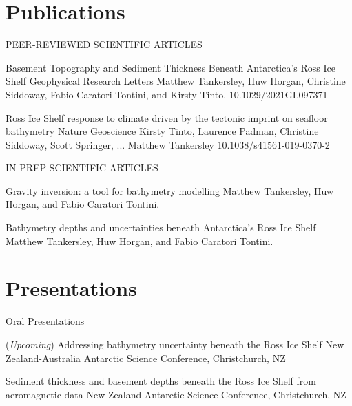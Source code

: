 \documentclass{ExpressiveResume}
\begin{document}
\section{Publications}
\noindent PEER-REVIEWED SCIENTIFIC ARTICLES \newline

\begin{cventries}
    {Basement Topography and Sediment Thickness Beneath Antarctica’s Ross Ice Shelf}
    {Geophysical Research Letters}
    {Matthew Tankersley, Huw Horgan, Christine Siddoway, Fabio Caratori Tontini, and Kirsty Tinto.}
    {10.1029/2021GL097371}

    {Ross Ice Shelf response to climate driven by the tectonic
        imprint on seafloor bathymetry}
    {Nature Geoscience}
    {Kirsty Tinto, Laurence Padman, Christine Siddoway, Scott Springer, ... Matthew Tankersley}
    {10.1038/s41561-019-0370-2}
\end{cventries}


\noindent IN-PREP SCIENTIFIC ARTICLES \newline

\begin{cventries}
    {Gravity inversion: a tool for bathymetry modelling}
    {Matthew Tankersley, Huw Horgan, and Fabio Caratori Tontini.}

    {Bathymetry depths and uncertainties beneath Antarctica's Ross Ice Shelf}
    {Matthew Tankersley, Huw Horgan, and Fabio Caratori Tontini.}

\end{cventries}


\section{Presentations}
\noindent Oral Presentations \newline

\begin{cventries}
    {(\textit{Upcoming}) Addressing bathymetry uncertainty beneath the Ross Ice Shelf}
    {New Zealand-Australia Antarctic Science Conference, Christchurch, NZ}
    {}
    {}

    {Sediment thickness and basement depths beneath the Ross Ice Shelf from aeromagnetic data}
    {New Zealand Antarctic Science Conference, Christchurch, NZ}
    {}
    {}

\end{cventries}
\end{document}
